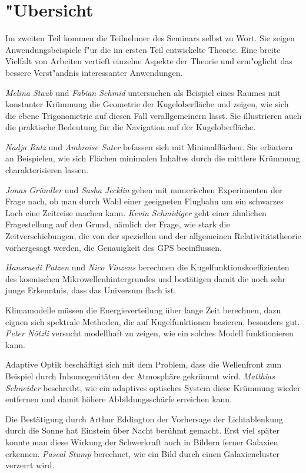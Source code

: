 %
%
%
\chapter*{"Ubersicht}
\rhead{}
\label{skript:uebersicht}
Im zweiten Teil kommen die Teilnehmer des Seminars selbst zu Wort.
Sie zeigen Anwendungsbeispiele f"ur die im ersten
Teil entwickelte Theorie.
Eine breite Vielfalt von Arbeiten vertieft einzelne Aspekte der Theorie
und erm"oglicht das bessere Verst"andnis interessanter Anwendungen.

{\em Melina Staub} und {\em Fabian Schmid} untersuchen als Beispiel
eines Raumes mit konstanter Krümmung die Geometrie der Kugeloberfläche
und zeigen, wie sich die ebene Trigonometrie auf diesen Fall verallgemeinern
lässt.
Sie illustrieren auch die praktische Bedeutung für die Navigation auf
der Kugeloberfläche.

{\em Nadja Rutz} und {\em Ambroise Suter} befassen sich mit Minimalflächen.
Sie erläutern an Beispielen, wie sich Flächen minimalen Inhaltes durch
die mittlere Krümmung charakterisieren lassen.

{\em Jonas Gründler} und {\em Sasha Jecklin} gehen mit numerischen
Experimenten der Frage nach, ob man durch Wahl einer geeigneten
Flugbahn um ein schwarzes Loch eine Zeitreise machen kann.
{\em Kevin Schmidiger} geht einer ähnlichen Fragestellung auf den Grund,
nämlich der Frage, wie stark die Zeitverschiebungen, die von der
speziellen und der allgemeinen Relativitätstheorie vorhergesagt werden,
die Genauigkeit des GPS beeinflussen.

{\em Hansruedi Patzen} und {\em Nico Vinzens} berechnen
die Kugelfunktionskoeffizienten des kosmischen Mikrowellenhintergrundes
und bestätigen damit die noch sehr junge Erkenntnis, dass das
Universum flach ist.

Klimamodelle müssen die Energieverteilung über lange Zeit berechnen,
dazu eignen sich spektrale Methoden, die auf Kugelfunktionen basieren,
besonders gut. {\em Peter Nötzli} versucht modellhaft zu zeigen, wie
ein solches Modell funktionieren kann.

Adaptive Optik beschäftigt sich mit dem Problem, dass die Wellenfront
zum Beispiel durch Inhomogenitäten der Atmosphäre gekrümmt wird.
{\em Matthias Schneider} beschreibt, wie ein adaptives optisches 
System diese Krümmung wieder entfernen und damit höhere Abbildungsschärfe
erreichen kann.

Die Bestätigung durch Arthur Eddington der Vorhersage der Lichtablenkung
durch die Sonne hat Einstein über Nacht berühmt gemacht.
Erst viel später konnte man diese Wirkung der Schwerkraft auch in
Bildern ferner Galaxien erkennen.
{\em Pascal Stump} berechnet, wie ein Bild durch einen Galaxiencluster
verzerrt wird.

